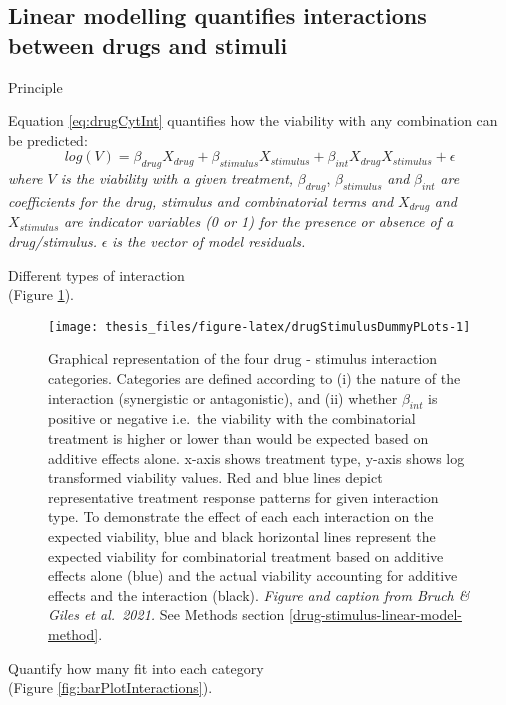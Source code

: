 \documentclass[11pt, a4paper, twosided]{book}
\begin{document}
\hypertarget{linear-modelling-quantifies-interactions-between-drugs-and-stimuli}{%
\subsection{Linear modelling quantifies interactions between drugs and stimuli}\label{linear-modelling-quantifies-interactions-between-drugs-and-stimuli}}

Principle

Equation \eqref{eq:drugCytInt} quantifies how the viability with any combination can be predicted:
\begin{equation}
            log(V) = \beta_{drug}X_{drug} + \beta_{stimulus}X_{stimulus} + \beta_{int}X_{drug}X_{stimulus} + \epsilon
                                       \label{eq:drugCytInt}
    \end{equation}
\emph{where \(V\) is the viability with a given treatment,} \(\beta_{drug}\), \(\beta_{stimulus}\) \emph{and} \(\beta_{int}\) \emph{are coefficients for the drug, stimulus and combinatorial terms and} \(X_{drug}\) \emph{and} \(X_{stimulus}\) \emph{are indicator variables (0 or 1) for the presence or absence of a drug/stimulus.} \(\epsilon\) \emph{is the vector of model residuals.}

Different types of interaction\\
(Figure \ref{fig:drugStimulusDummyPLots}).


\begin{figure}

{\centering \texttt{[image: thesis\_files/figure-latex/drugStimulusDummyPLots-1]} 

}

\caption{Graphical representation of the four drug - stimulus interaction categories. Categories are defined according to (i) the nature of the interaction (synergistic or antagonistic), and (ii) whether \(\beta_{int}\) is positive or negative i.e.~the viability with the combinatorial treatment is higher or lower than would be expected based on additive effects alone. x-axis shows treatment type, y-axis shows log transformed viability values. Red and blue lines depict representative treatment response patterns for given interaction type. To demonstrate the effect of each each interaction on the expected viability, blue and black horizontal lines represent the expected viability for combinatorial treatment based on additive effects alone (blue) and the actual viability accounting for additive effects and the interaction (black). \emph{Figure and caption from Bruch \& Giles et al.~2021.} See Methods section \ref{drug-stimulus-linear-model-method}.}\label{fig:drugStimulusDummyPLots}
\end{figure}
Quantify how many fit into each category\\
(Figure \ref{fig:barPlotInteractions}).
\end{document}
